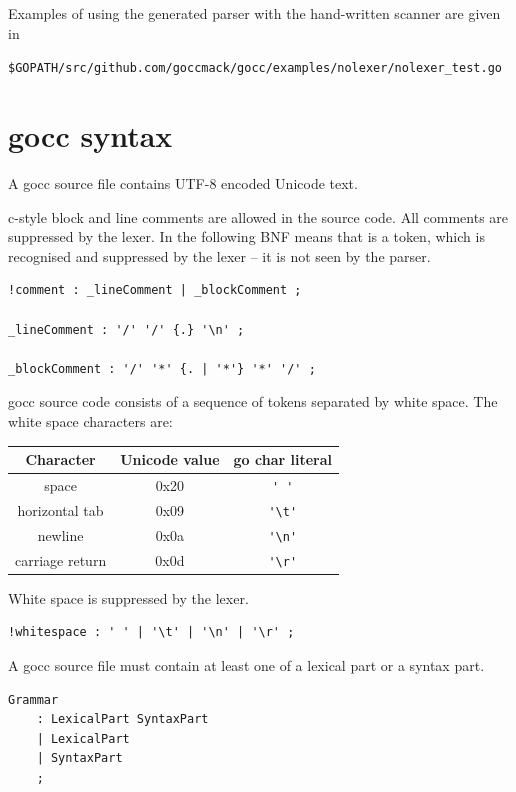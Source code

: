 \documentclass[12pt]{article}
\begin{document}
    

    Examples of using the generated parser with the hand-written scanner are given in

    \verb|$GOPATH/src/github.com/goccmack/gocc/examples/nolexer/nolexer_test.go|

\section{gocc syntax}\label{sec:gocc syntax}
	A gocc source file contains UTF-8 encoded Unicode text.

	c-style block and line comments are allowed in the source code. All comments are suppressed by the lexer.
	In the following BNF  means that  is a token, which is recognised and suppressed by the lexer -- it is not seen by the parser.

	\begin{Verbatim}[frame=single]
!comment : _lineComment | _blockComment ;

_lineComment : '/' '/' {.} '\n' ;

_blockComment : '/' '*' {. | '*'} '*' '/' ;
	\end{Verbatim}

	gocc source code consists of a sequence of tokens separated by white space. The white space characters are:

	\begin{tabular}{ccc}
		\bf Character & \bf Unicode value & \bf go char literal\\
		\hline
		space	& 0x20 & \verb|' '| \\
		horizontal tab & 0x09 & \verb|'\t'| \\
		newline & 0x0a & \verb|'\n'| \\
		carriage return & 0x0d & \verb|'\r'| \\
	\end{tabular}

	White space is suppressed by the lexer.

	\begin{Verbatim}[frame=single]
!whitespace : ' ' | '\t' | '\n' | '\r' ;
	\end{Verbatim}



	A gocc source file must contain at least one of a lexical part or a syntax part.

	\begin{Verbatim}[frame=single]
Grammar
    : LexicalPart SyntaxPart
    | LexicalPart
    | SyntaxPart
    ;
\end{Verbatim}
\end{document}
